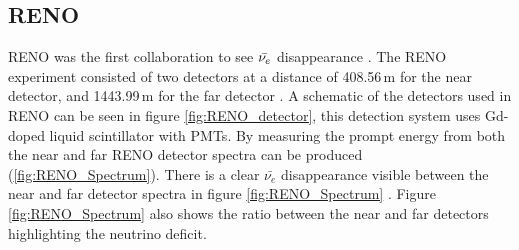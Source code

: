 \subsection{RENO}
RENO was the first collaboration to see $\Bar{\nu_e}$ disappearance \cite{Olive_2014}. The RENO experiment consisted of two detectors at a distance of 408.56\,m for the near detector, and 1443.99\,m for the far detector \cite{reno_may_2012}. A schematic of the detectors used in RENO can be seen in figure \ref{fig:RENO_detector}, this detection system uses Gd-doped liquid scintillator with PMTs. By measuring the prompt energy from both the near and far RENO detector spectra can be produced (\ref{fig:RENO_Spectrum}). There is a clear $\bar{\nu_e}$ disappearance visible between the near and far detector spectra in figure \ref{fig:RENO_Spectrum} \cite{reno_may_2012}. Figure \ref{fig:RENO_Spectrum} also shows the ratio between the near and far detectors highlighting the neutrino deficit. 

